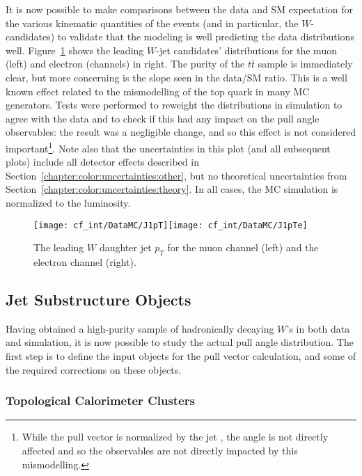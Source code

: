 It is now possible to make comparisons between the data and SM expectation for the various kinematic quantities of the events (and in particular, the $W$-candidates) to validate that the modeling is well predicting the data distributions well. Figure~\ref{fig:color:yields:pts} shows the leading $W$-jet candidates' \pt distributions for the muon (left) and electron (channels) in right. The purity of the $t\bar{t}$ sample is immediately clear, but more concerning is the slope seen in the data/SM ratio. This is a well known effect related to the mismodelling of the top quark \pt in many MC generators. Tests were performed to reweight the \pt distributions in simulation to agree with the data and to check if this had any impact on the pull angle observables: the result was a negligible change, and so this effect is not considered important\footnote{While the pull vector is normalized by the jet \pt, the angle is not directly affected and so the observables are not directly impacted by this mismodelling.}. Note also that the uncertainties in this plot (and all subsequent plots) include all detector effects described in Section~\ref{chapter:color:uncertainties:other}, but no theoretical uncertainties from Section~\ref{chapter:color:uncertainties:theory}. In all cases, the MC simulation is normalized to the luminosity.


\begin{figure}[h!]
\begin{center}
\texttt{[image: cf\_int/DataMC/J1pT]}\texttt{[image: cf\_int/DataMC/J1pTe]}
 \caption{The leading $W$ daughter jet $p_T$ for the muon channel (left) and the electron channel (right).}
 \label{fig:color:yields:pts}
  \end{center}
\end{figure}



	\subsection{Jet Substructure Objects}

Having obtained a high-purity sample of hadronically decaying $W$'s in both data and simulation, it is now possible to study the actual pull angle distribution. The first step is to define the input objects for the pull vector calculation, and some of the required corrections on these objects.

	\subsubsection{Topological Calorimeter Clusters}

